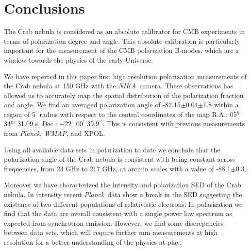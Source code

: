 \documentclass[twocolumn,traditabstract]{aa}
\def\NIKA{\textit{NIKA}}
\def\Planck{\textit{Planck}}
\def\WMAP{\textit{WMAP}}
\begin{document}



\section{Conclusions}\label{sec:conclusions}
The Crab nebula is considered as an absolute calibrator for CMB experiments in terms of polarization degree and angle. This absolute calibration is particularly important for the measurement of the CMB polarization B-modes, which are a window towards the physics of the early Universe.

We have reported in this paper first high resolution polarization measurements of the Crab nebula at 150 GHz with the \NIKA\ camera. These observations has allowed us to accurately map the spatial distribution of the polarization fraction and angle. 
We find an averaged polarization angle of -87.15$\pm$0.04$\pm$1.8 within a region of 5$^\prime$ radius with respect to the central coordinates of the map R.A.: 05$^{h}$ 34$^{m}$ 31.09 s, Dec.: +22$^{\circ}$ 00$^{\prime}$ 39.9$^{\prime\prime}$.
This is consistent with previous measurements from \Planck, \WMAP, and XPOL.

Using all available data sets in polarization to date we conclude that the polarization angle of the Crab nebula is consistent with being constant across frequencies, from 23 GHz to 217 GHz, at arcmin scales with a value of -88.1$\pm$0.3. 

Moreover we have characterized the intensity and polarization SED of the Crab nebula. 
In intensity recent \Planck\ data show a break in the SED suggesting the existence of two different populations of relativistic electrons. In polarization we find that the data are overall consistent with a single power law spectrum as expected from synchrotron emission. However, we find some discrepancies between data sets, which will require further mm measurements at high resolution for a better understanding of the physics at play. 
\end{document}
